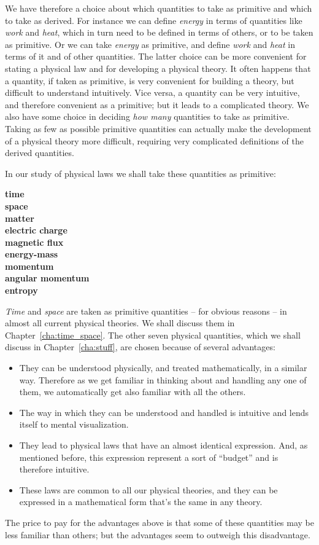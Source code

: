 \documentclass[a4paper,12pt,%
onecolumn,oneside,%
british%
]{memoir}
\renewcommand*{\|}[1][]{\nonscript\:#1\vert\nonscript\:\mathopen{}}
\newcommand*{\chap}{Chapter}%
\begin{document}
We have therefore a choice about which quantities to take as primitive and which to take as derived. For instance we can define \emph{energy} in terms of quantities like \emph{work} and \emph{heat}, which in turn need to be defined in terms of others, or to be taken as primitive. Or we can take \emph{energy} as primitive, and define \emph{work} and \emph{heat} in terms of it and of other quantities. The latter choice can be more convenient for stating a physical law and for developing a physical theory. It often happens that a quantity, if taken as primitive, is very convenient for building a theory, but difficult to understand intuitively. Vice versa, a quantity can be very intuitive, and therefore convenient as a primitive; but it leads to a complicated theory. We also have some choice in deciding \emph{how many} quantities to take as primitive. Taking as few as possible primitive quantities can actually make the development of a physical theory more difficult, requiring very complicated definitions of the derived quantities.

\medskip

In our study of physical laws we shall take these quantities as primitive:
\begin{center}\bfseries
  time \\ space \\[2\jot] matter \\ electric charge \\ magnetic flux \\ energy-mass \\ momentum \\ angular momentum \\ entropy
\end{center}

\emph{Time} and \emph{space} are taken as primitive quantities -- for obvious reasons -- in almost all current physical theories. We shall discuss them in \chap~\ref{cha:time_space}. The other seven physical quantities, which we shall discuss in \chap~\ref{cha:stuff}, are chosen because of several advantages:
\begin{itemize}[label={\small{}}]
\item They can be understood physically, and treated mathematically, in a similar way. Therefore as we get familiar in thinking about and handling any one of them, we automatically get also familiar with all the others.
\item The way in which they can be understood and handled is intuitive and lends itself to mental visualization.
\item They lead to physical laws that have an almost identical expression. And, as mentioned before, this expression represent a sort of \enquote{budget} and is therefore intuitive.
\item These laws are common to all our physical theories, and they can be expressed in a mathematical form that's the same in any theory.
\end{itemize}
The price to pay for the advantages above is that some of these quantities may be less familiar than others; but the advantages seem to outweigh this disadvantage.
\end{document}
